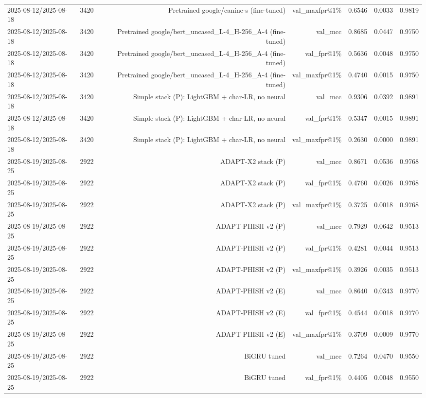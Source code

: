 \begin{table}[t]
\begin{tabular}{llrrrrr}
2025-08-12/2025-08-18 & 3420 & Pretrained google/canine-s (fine-tuned) & val\_maxfpr@1\% & 0.6546 & 0.0033 & 0.9819 \\
2025-08-12/2025-08-18 & 3420 & Pretrained google/bert\_uncased\_L-4\_H-256\_A-4 (fine-tuned) & val\_mcc & 0.8685 & 0.0447 & 0.9750 \\
2025-08-12/2025-08-18 & 3420 & Pretrained google/bert\_uncased\_L-4\_H-256\_A-4 (fine-tuned) & val\_fpr@1\% & 0.5636 & 0.0048 & 0.9750 \\
2025-08-12/2025-08-18 & 3420 & Pretrained google/bert\_uncased\_L-4\_H-256\_A-4 (fine-tuned) & val\_maxfpr@1\% & 0.4740 & 0.0015 & 0.9750 \\
2025-08-12/2025-08-18 & 3420 & Simple stack (P): LightGBM + char-LR, no neural & val\_mcc & 0.9306 & 0.0392 & 0.9891 \\
2025-08-12/2025-08-18 & 3420 & Simple stack (P): LightGBM + char-LR, no neural & val\_fpr@1\% & 0.5347 & 0.0015 & 0.9891 \\
2025-08-12/2025-08-18 & 3420 & Simple stack (P): LightGBM + char-LR, no neural & val\_maxfpr@1\% & 0.2630 & 0.0000 & 0.9891 \\
2025-08-19/2025-08-25 & 2922 & ADAPT-X2 stack (P) & val\_mcc & 0.8671 & 0.0536 & 0.9768 \\
2025-08-19/2025-08-25 & 2922 & ADAPT-X2 stack (P) & val\_fpr@1\% & 0.4760 & 0.0026 & 0.9768 \\
2025-08-19/2025-08-25 & 2922 & ADAPT-X2 stack (P) & val\_maxfpr@1\% & 0.3725 & 0.0018 & 0.9768 \\
2025-08-19/2025-08-25 & 2922 & ADAPT-PHISH v2 (P) & val\_mcc & 0.7929 & 0.0642 & 0.9513 \\
2025-08-19/2025-08-25 & 2922 & ADAPT-PHISH v2 (P) & val\_fpr@1\% & 0.4281 & 0.0044 & 0.9513 \\
2025-08-19/2025-08-25 & 2922 & ADAPT-PHISH v2 (P) & val\_maxfpr@1\% & 0.3926 & 0.0035 & 0.9513 \\
2025-08-19/2025-08-25 & 2922 & ADAPT-PHISH v2 (E) & val\_mcc & 0.8640 & 0.0343 & 0.9770 \\
2025-08-19/2025-08-25 & 2922 & ADAPT-PHISH v2 (E) & val\_fpr@1\% & 0.4544 & 0.0018 & 0.9770 \\
2025-08-19/2025-08-25 & 2922 & ADAPT-PHISH v2 (E) & val\_maxfpr@1\% & 0.3709 & 0.0009 & 0.9770 \\
2025-08-19/2025-08-25 & 2922 & BiGRU tuned & val\_mcc & 0.7264 & 0.0470 & 0.9550 \\
2025-08-19/2025-08-25 & 2922 & BiGRU tuned & val\_fpr@1\% & 0.4405 & 0.0048 & 0.9550 \\

\end{tabular}
\end{table}
